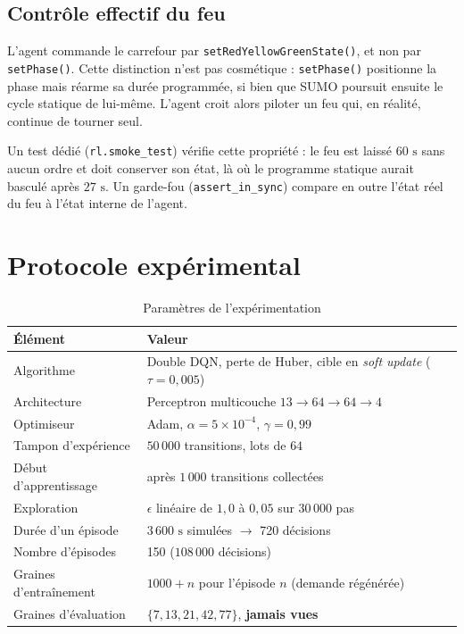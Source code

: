 \documentclass[11pt,a4paper]{article}
\begin{document}
\subsection{Contrôle effectif du feu}

L'agent commande le carrefour par \texttt{setRedYellowGreenState()}, et non par
\texttt{setPhase()}. Cette distinction n'est pas cosmétique : \texttt{setPhase()}
positionne la phase mais réarme sa durée programmée, si bien que SUMO poursuit
ensuite le cycle statique de lui-même. L'agent croit alors piloter un feu qui, en
réalité, continue de tourner seul.

Un test dédié (\texttt{rl.smoke\_test}) vérifie cette propriété : le feu est laissé
$60\text{ s}$ sans aucun ordre et doit conserver son état, là où le programme statique
aurait basculé après $27\text{ s}$. Un garde-fou (\texttt{assert\_in\_sync}) compare
en outre l'état réel du feu à l'état interne de l'agent.

\section{Protocole expérimental}

\begin{table}[H]
\centering
\caption{Paramètres de l'expérimentation}
\label{tab:protocole}
\vspace{0.2cm}
\begin{tabular}{ll}
\toprule
\textbf{Élément} & \textbf{Valeur} \\
\midrule
Algorithme & Double DQN, perte de Huber, cible en \textit{soft update} ($\tau = 0{,}005$) \\
Architecture & Perceptron multicouche $13 \rightarrow 64 \rightarrow 64 \rightarrow 4$ \\
Optimiseur & Adam, $\alpha = 5 \times 10^{-4}$, $\gamma = 0{,}99$ \\
Tampon d'expérience & $50\,000$ transitions, lots de $64$ \\
Début d'apprentissage & après $1\,000$ transitions collectées \\
Exploration & $\epsilon$ linéaire de $1{,}0$ à $0{,}05$ sur $30\,000$ pas \\
\midrule
Durée d'un épisode & $3\,600\text{ s}$ simulées $\rightarrow$ 720 décisions \\
Nombre d'épisodes & 150 ($108\,000$ décisions) \\
Graines d'entraînement & $1000 + n$ pour l'épisode $n$ (demande régénérée) \\
Graines d'évaluation & $\{7, 13, 21, 42, 77\}$, \textbf{jamais vues} \\
\bottomrule
\end{tabular}
\end{table}
\end{document}
